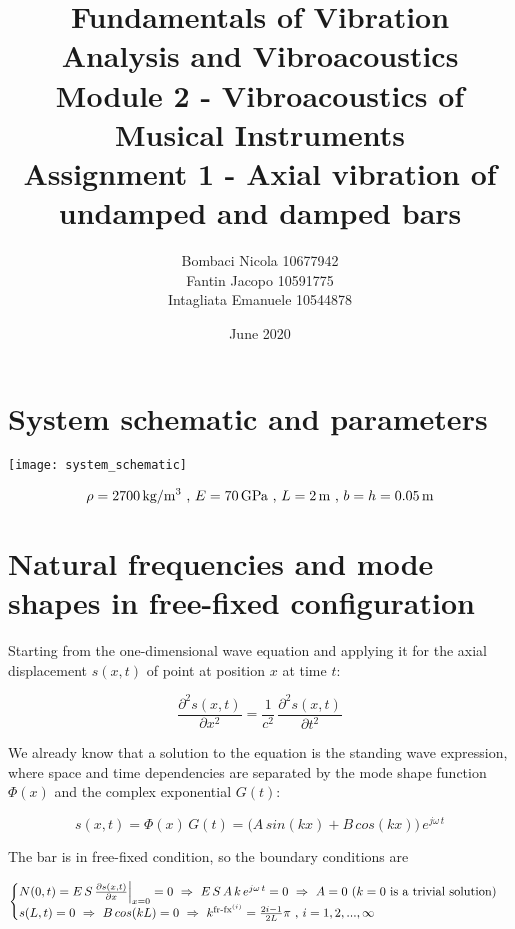 \documentclass[a4paper,12pt,oneside]{article}
\title{Fundamentals of Vibration Analysis and Vibroacoustics \\
	Module 2 - Vibroacoustics of Musical Instruments \\
	Assignment 1 - Axial vibration of undamped and damped bars}
\author{Bombaci Nicola 10677942 \\
	Fantin Jacopo 10591775 \\
	Intagliata Emanuele 10544878}
\date{June 2020}
\begin{document}
\maketitle

\vspace{100pt}

\section*{System schematic and parameters}

\texttt{[image: system\_schematic]}

\vspace{30pt}

\[
	\rho = 2700 \, \text{kg/m\textsuperscript{3}} ~ \text{,} ~ E = 70 \, \text{GPa} %
		~ \text{,} ~ L = 2 \, \text{m} ~ \text{,} ~ b = h = 0.05 \, \text{m}
\]

\clearpage


\section{Natural frequencies and mode shapes in free-fixed configuration}

Starting from the one-dimensional wave equation and applying it for the axial displacement $ s(x,t) $ of point at position $ x $ at time $ t $:

\[
	\frac{\partial^2 s(x,t)}{\partial x^2} = %
		\frac{1}{c^2} \, \frac{\partial^2 s(x,t)}{\partial t^2}
\]

We already know that a solution to the equation is the standing wave expression, where space and time dependencies are separated by the mode shape function $ \Phi(x) $ and the complex exponential $ G(t) $:

\[
	s(x,t) = \Phi(x) \, G(t) = %
		\bigl(A \, sin(kx) + B \, cos(kx)\bigl) \, e^{j \omega \, t}
\]

\vspace{10pt}

The bar is in free-fixed condition, so the boundary conditions are

\[ \begin{cases}
	N(0,t) = E \, S \, \frac{\partial s(x,t)}{\partial x} \Big|_{x=0} = 0 %
		~ \Rightarrow ~ E \, S \, A \, k \, e^{j \omega \, t} = 0 %
		~ \Rightarrow ~ A = 0 ~ \text{($ k = 0 $ is a trivial solution)} \\
	s(L,t) = 0 ~ \Rightarrow ~ B \, cos(kL) = 0 ~ \Rightarrow ~ %
		k^{\textup{fr-fx}^{(i)}} = \frac{2i - 1}{2L} \pi %
		~ \text{,} ~ i = 1,2,...,\infty
\end{cases} \]
\end{document}
